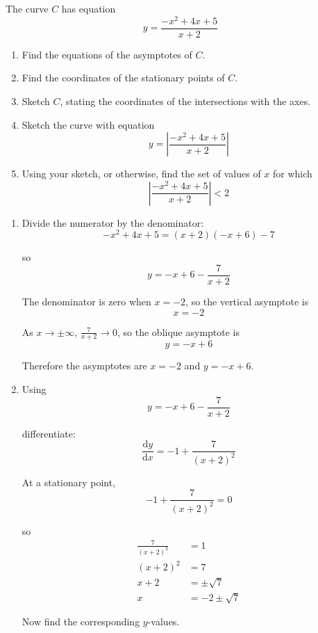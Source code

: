 \documentclass[leqno]{article}
\begin{document}
\begin{enumerate}[
  label=\textbf{\arabic*.},
  leftmargin=*,
  topsep=0pt,
  partopsep=0pt,
  parsep=0pt
]
The curve $C$ has equation
\[
y=\dfrac{-x^2+4x+5}{x+2}
\]
\begin{enumerate}[label=\textbf{(\alph*)}]
  \item Find the equations of the asymptotes of $C$.  \\
  \item Find the coordinates of the stationary points of $C$.  \\
  \item Sketch $C$, stating the coordinates of the intersections with the axes.  \\
  \item Sketch the curve with equation
  \[
  y=\left|\dfrac{-x^2+4x+5}{x+2}\right|
  \]
  \item Using your sketch, or otherwise, find the set of values of $x$ for which
  \[
  \left|\dfrac{-x^2+4x+5}{x+2}\right|<2
  \]
\end{enumerate}

\vspace*{10pt}

\begin{djsSolution}
\begin{enumerate}[label=\textbf{(\alph*)}]
  \item Divide the numerator by the denominator:
  \[
  -x^2+4x+5=(x+2)(-x+6)-7
  \]

  so
  \[
  y=-x+6-\frac{7}{x+2}
  \]

  The denominator is zero when \(x=-2\), so the vertical asymptote is
  \[
  x=-2
  \]

  As \(x\to\pm\infty\), \(\frac{7}{x+2}\to 0\), so the oblique asymptote is
  \[
  y=-x+6
  \]

  Therefore the asymptotes are $x=-2$ and $y=-x+6$.

  \item Using
  \[
  y=-x+6-\frac{7}{x+2}
  \]

  differentiate:
  \[
  \frac{\mathrm{d}y}{\mathrm{d}x}=-1+\frac{7}{(x+2)^2}
  \]

  At a stationary point,
  \[
  -1+\frac{7}{(x+2)^2}=0
  \]

  so
  \begin{align*}
  \frac{7}{(x+2)^2}&=1\\
  (x+2)^2&=7\\
  x+2&=\pm\sqrt7\\
  x&=-2\pm\sqrt7
  \end{align*}

  Now find the corresponding $y$-values.


\end{enumerate}
\end{djsSolution}
\end{enumerate}
\end{document}
